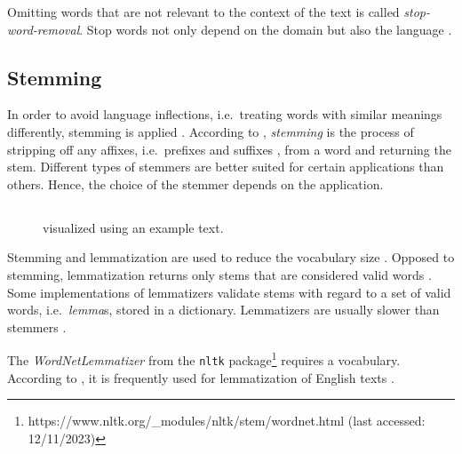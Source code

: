 Omitting words that are not relevant to the context of the text is called \textit{stop-word-removal}.
Stop words not only depend on the domain but also the language \cite{IR2011}.


\subsection{Stemming}\label{subsec:stemming}

In order to avoid language inflections, i.e.\ treating words with similar meanings differently, stemming is applied \cite{clusteringDocs2020}.
According to \citeauthor{nlp-book2009}, \textit{stemming} is the process of stripping off any affixes, i.e.\ prefixes and suffixes \cite{IR2011}, 
from a word and returning the stem.
Different types of stemmers are better suited for certain applications than others.
Hence, the choice of the stemmer depends on the application.



\subsection{\Lemmatization{}}\label{subsec:lemmatization}

\begin{figure}[!htb] %
    \centering
    
    \caption[\Lemmatization{}]{\Lemmatization{} visualized using an example text.}
    \label{fig:preproc-lemmatization}
\end{figure}

Stemming and lemmatization are used to reduce the vocabulary size \cite{clusteringDocs2020}.
Opposed to stemming, lemmatization returns only stems that are considered valid words \cite{nlp-book2009}.
Some implementations of lemmatizers validate stems with regard to a set of valid words, i.e.\ \textit{lemma}s, stored in a dictionary.
Lemmatizers are usually slower than stemmers \cite{nlp-book2009}.

The \textit{WordNetLemmatizer} from the \texttt{nltk} package\footnote{https://www.nltk.org/\_modules/nltk/stem/wordnet.html (last accessed: 12/11/2023)} requires a vocabulary. %
According to \citeauthor{clusteringDocs2020}, it is frequently used for lemmatization of English texts \cite{clusteringDocs2020}.



